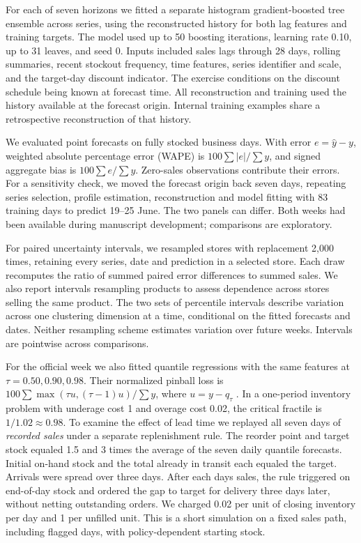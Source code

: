\documentclass[11pt,a4paper]{article}
\begin{document}
For each of seven horizons we fitted a separate histogram gradient-boosted tree ensemble across series, using the reconstructed history for both lag features and training targets. The model used up to 50 boosting iterations, learning rate 0.10, up to 31 leaves, and seed 0. Inputs included sales lags through 28 days, rolling summaries, recent stockout frequency, time features, series identifier and scale, and the target-day discount indicator. The exercise conditions on the discount schedule being known at forecast time. All reconstruction and training used the history available at the forecast origin. Internal training examples share a retrospective reconstruction of that history.

We evaluated point forecasts on fully stocked business days. With error \(e=\widehat y-y\), weighted absolute percentage error (WAPE) is \(100\sum|e|/\sum y\), and signed aggregate bias is \(100\sum e/\sum y\). Zero-sales observations contribute their errors. For a sensitivity check, we moved the forecast origin back seven days, repeating series selection, profile estimation, reconstruction and model fitting with 83 training days to predict 19--25 June. The two panels can differ. Both weeks had been available during manuscript development; comparisons are exploratory.

For paired uncertainty intervals, we resampled stores with replacement 2,000 times, retaining every series, date and prediction in a selected store. Each draw recomputes the ratio of summed paired error differences to summed sales. We also report intervals resampling products to assess dependence across stores selling the same product. The two sets of percentile intervals describe variation across one clustering dimension at a time, conditional on the fitted forecasts and dates. Neither resampling scheme estimates variation over future weeks. Intervals are pointwise across comparisons.

For the official week we also fitted quantile regressions with the same features at \(\tau=0.50,0.90,0.98\). Their normalized pinball loss is \(100\sum\max(\tau u,(\tau-1)u)/\sum y\), where \(u=y-\widehat q_\tau\) \cite{ref9,ref10}. In a one-period inventory problem with underage cost 1 and overage cost 0.02, the critical fractile is \(1/1.02\approx0.98\). To examine the effect of lead time we replayed all seven days of \emph{recorded sales} under a separate replenishment rule. The reorder point and target stock equaled 1.5 and 3 times the average of the seven daily quantile forecasts. Initial on-hand stock and the total already in transit each equaled the target. Arrivals were spread over three days. After each day\textquotesingle s sales, the rule triggered on end-of-day stock and ordered the gap to target for delivery three days later, without netting outstanding orders. We charged 0.02 per unit of closing inventory per day and 1 per unfilled unit. This is a short simulation on a fixed sales path, including flagged days, with policy-dependent starting stock.
\end{document}
